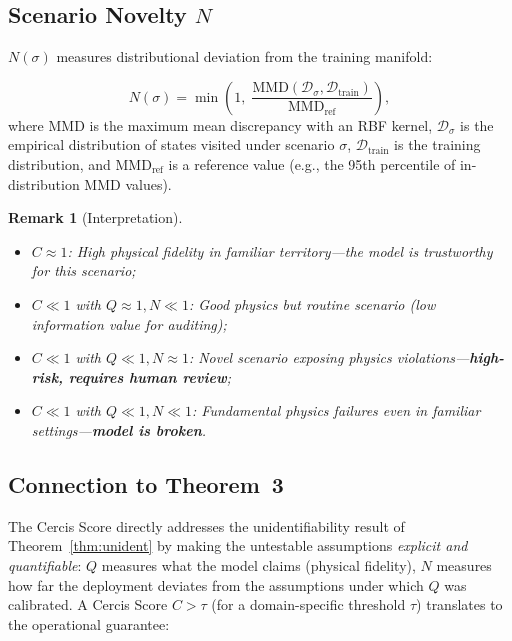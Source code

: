 \documentclass[11pt,twocolumn]{article}
\newtheorem{remark}[theorem]{Remark}
\theoremstyle{definition}
\newcommand{\cD}{\mathcal{D}}
\begin{document}
\subsection{Scenario Novelty $N$}

$N(\sigma)$ measures distributional deviation from the training manifold:

\begin{equation}
  N(\sigma) = \min\!\left(1,\;
    \frac{\text{MMD}(\cD_\sigma, \cD_{\text{train}})}
         {\text{MMD}_{\text{ref}}}
  \right),
\end{equation}
where $\text{MMD}$ is the maximum mean discrepancy with an RBF kernel,
$\cD_\sigma$ is the empirical distribution of states visited under scenario
$\sigma$, $\cD_{\text{train}}$ is the training distribution, and
$\text{MMD}_{\text{ref}}$ is a reference value (e.g., the 95th percentile of
in-distribution MMD values).

\begin{remark}[Interpretation]
\begin{itemize}[nosep]
  \item $C \approx 1$: High physical fidelity in familiar territory---the
    model is trustworthy for this scenario;
  \item $C \ll 1$ with $Q \approx 1, N \ll 1$: Good physics but routine
    scenario (low information value for auditing);
  \item $C \ll 1$ with $Q \ll 1, N \approx 1$: Novel scenario exposing
    physics violations---\textbf{high-risk, requires human review};
  \item $C \ll 1$ with $Q \ll 1, N \ll 1$: Fundamental physics failures even
    in familiar settings---\textbf{model is broken}.
\end{itemize}
\end{remark}

\subsection{Connection to Theorem~3}

The Cercis Score directly addresses the unidentifiability result of
Theorem~\ref{thm:unident} by making the untestable assumptions \emph{explicit
and quantifiable}: $Q$ measures what the model claims (physical fidelity),
$N$ measures how far the deployment deviates from the assumptions under which
$Q$ was calibrated.  A Cercis Score $C > \tau$ (for a domain-specific
threshold $\tau$) translates to the operational guarantee:
\end{document}

